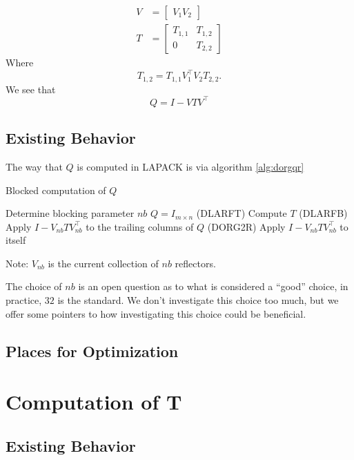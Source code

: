 \documentclass[12pt]{article}
\begin{document}
    \begin{align*}
        V &= \begin{bmatrix} V_1 V_2 \end{bmatrix}\\
        T &= \begin{bmatrix} 
            T_{1,1} & T_{1,2} \\
            0       & T_{2,2}
        \end{bmatrix}
    \end{align*}
    Where 
    $$
    T_{1,2} = T_{1,1}V_1^\top V_2T_{2,2}.
    $$
    We see that 
    \[
        Q = I - VTV^\top
    \]
    \subsection{Existing Behavior}
    The way that $Q$ is computed in LAPACK is via algorithm \ref{alg:dorgqr}

    \begin{algorithm}
        \caption{Blocked computation of $Q$}\label{alg:dorgqr}
        \begin{algorithmic}[1]
            \STATE Determine blocking parameter $nb$
            \STATE $Q = I_{m\times n}$
                \STATE (DLARFT) Compute $T$
                \STATE (DLARFB) Apply $I-V_{nb}TV_{nb}^\top$ to the trailing columns of $Q$
                \STATE (DORG2R) Apply $I-V_{nb}TV_{nb}^\top$ to itself
            \ENDFOR
        \end{algorithmic}
    \end{algorithm}

    Note: $V_{nb}$ is the current collection of $nb$ reflectors.

    The choice of $nb$ is an open question as to what is considered a ``good'' choice, in practice, $32$ is 
    the standard. We don't investigate this choice too much, but we offer some pointers to how investigating this choice could be beneficial.
    \subsection{Places for Optimization}
    \section{Computation of T}
    \subsection{Existing Behavior}
\end{document}
